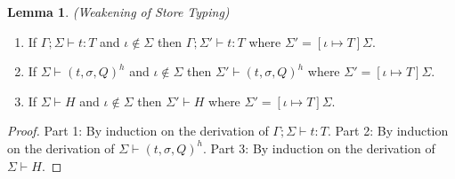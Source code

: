 \documentclass{article}
\theoremstyle{definition}
\newtheorem{lem}{Lemma}[section]
\begin{document}
\begin{lem}
\emph{(Weakening of Store Typing)}\label{lem:weakening-store-typing}
\begin{enumerate}
\item If $\Gamma ; \Sigma \vdash t : T$ and $\iota \notin \Sigma$ then $\Gamma ; \Sigma' \vdash t : T$ where $\Sigma' = [\iota \mapsto T]\Sigma$.
\item If $\Sigma \vdash (t, \sigma, Q)^h$ and $\iota \notin \Sigma$ then $\Sigma' \vdash (t, \sigma, Q)^h$ where $\Sigma' = [\iota \mapsto T]\Sigma$.
\item If $\Sigma \vdash H$ and $\iota \notin \Sigma$ then $\Sigma' \vdash H$ where $\Sigma' = [\iota \mapsto T]\Sigma$.
\end{enumerate}
\end{lem}
\begin{proof}
Part 1: By induction on the derivation of $\Gamma ; \Sigma \vdash t : T$. Part 2: By induction on the derivation of $\Sigma \vdash (t, \sigma, Q)^h$. Part 3: By induction on the derivation of $\Sigma \vdash H$.
\end{proof}
\end{document}
